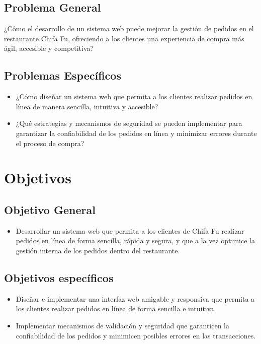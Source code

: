 \documentclass{article}
\begin{document}
\begin{doublespace}
    \subsection{Problema General}
    \noindent ¿Cómo el desarrollo de un sistema web puede mejorar la gestión de pedidos en el restaurante Chifa Fu, ofreciendo a los clientes una experiencia de compra más ágil, accesible y competitiva?

    
    \subsection{Problemas Específicos}
    \begin{itemize}
        \item ¿Cómo diseñar un sistema web que permita a los clientes realizar pedidos en línea de manera sencilla, intuitiva y accesible?
        \item ¿Qué estrategias y mecanismos de seguridad se pueden implementar para garantizar la confiabilidad de los pedidos en línea y minimizar errores durante el proceso de compra?
    \end{itemize}

    \section{Objetivos}
    \subsection{Objetivo General}
    \begin{itemize}
        \item Desarrollar un sistema web que permita a los clientes de Chifa Fu realizar pedidos en línea de forma sencilla, rápida y segura, y que a la vez optimice la gestión interna de los pedidos dentro del restaurante.
    \end{itemize}
    \subsection{Objetivos específicos}
    \begin{itemize}
        \item Diseñar e implementar una interfaz web amigable y responsiva que permita a los clientes realizar pedidos en línea de forma sencilla e intuitiva.
        \item Implementar mecanismos de validación y seguridad que garanticen la confiabilidad de los pedidos y minimicen posibles errores en las transacciones.
    \end{itemize}

\end{doublespace}
\end{document}
